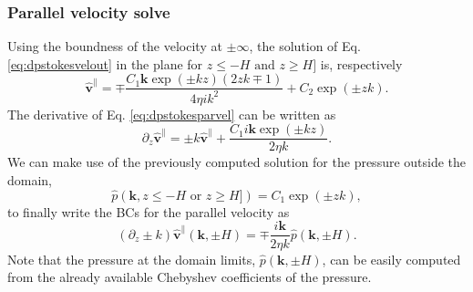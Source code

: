 \documentclass[ twoside,openright,titlepage,numbers=noenddot,%
headinclude,footinclude,cleardoublepage=empty,abstract=on,
BCOR=5mm,paper=b5,fontsize=11pt, dvipsnames
]{scrreprt}
\renewcommand{\vec}[1]{\bm{#1}}
\newcommand{\fou}[1]{\widehat{#1}}
\newcommand{\fvel}{v}
\begin{document}
\subsubsection*{Parallel velocity solve}
Using the boundness of the velocity at $\pm\infty$, the solution of Eq. \eqref{eq:dpstokesvelout} in the plane for $z \le -H \text{ and } z\ge H]$ is, respectively
\begin{equation}
  \label{eq:dpstokesparvel}
  \fou{\vec{\fvel}}^{\parallel} = \mp\frac{C_1\vec{k}\exp(\pm kz)\left(2zk\mp 1\right)}{4\eta ik^2} + C_2\exp(\pm zk).
\end{equation}
The derivative of Eq. \eqref{eq:dpstokesparvel} can be written as
\begin{equation}
  \label{eq:dpstokesparvelder}
  \partial_z\fou{\vec{\fvel}}^{\parallel} = \pm k\fou{\vec{\fvel}}^{\parallel} + \frac{C_1i\vec{k}\exp(\pm kz)}{2\eta k}.
\end{equation}
We can make use of the previously computed solution for the pressure outside the domain,
\begin{equation}
  \label{eq:dpstokespresout}
\fou{p}(\vec{k}, z \le -H \text{ or } z\ge H]) = C_1\exp\left(\pm zk\right),
\end{equation}
to finally write the \glspl{BC} for the parallel velocity as
\begin{equation}
  \label{eq:dpstokesparvelbc}
  \left(\partial_z\pm k\right)\fou{\vec{\fvel}}^\parallel(\vec{k}, \pm H) = \mp \frac{i\vec{k}}{2\eta k}\fou{p}(\vec{k}, \pm H).
\end{equation}
Note that the pressure at the domain limits, $\fou{p}(\vec{k}, \pm H)$, can be easily computed from the already available Chebyshev coefficients of the pressure.
\end{document}

